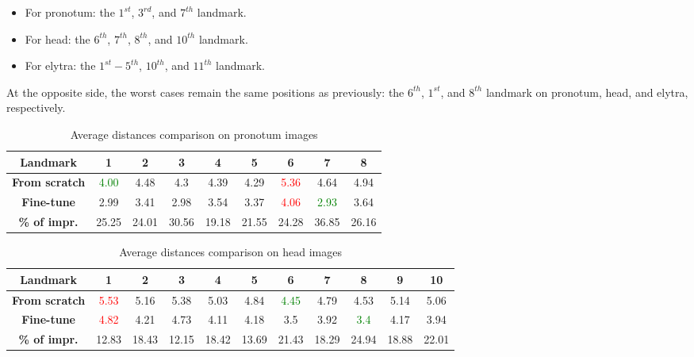 \documentclass[review]{elsarticle}
\begin{document}
\begin{itemize}
	\item For pronotum: the $1^{st}$, $3^{rd}$, and $7^{th}$ landmark.
	\item For head: the $6^{th}$, $7^{th}$, $8^{th}$, and $10^{th}$ landmark.
	\item For elytra: the $1^{st} - 5 ^{th}$, $10^{th}$, and $11^{th}$ landmark.
\end{itemize}

At the opposite side, the worst cases remain the same positions as previously: the $6^{th}$, $1^{st}$, and $8^{th}$ landmark on pronotum, head, and elytra, respectively.

\begin{table}[h!]
	\centering
	\begin{tabular}{| c || c | c | c | c | c | c | c | c |}
		\hline
		\textbf{Landmark} & 1 & 2 & 3 & 4 & 5 & 6 & 7 & 8 \\ \hline \hline
		\textbf{From scratch} & \textcolor{green}{4.00} & 4.48 & 4.3 & 4.39 & 4.29 & \textcolor{red}{5.36} & 4.64 & 4.94 \\ \hline
		\textbf{Fine-tune} & 2.99 & 3.41 & 2.98 & 3.54 & 3.37 & \textcolor{red}{4.06} & \textcolor{green}{2.93} & 3.64 \\ \hline \hline
		\textbf{\% of impr.} & 25.25 & 24.01 & 30.56 & 19.18 & 21.55 & 24.28 & 36.85 & 26.16 \\ \hline
	\end{tabular}
	\caption{Average distances comparison on pronotum images}
	\label{tblfn_pronotum}
\end{table}

\begin{table}[h!]
	\centering
	\begin{tabular}{| c || c | c | c | c | c | c | c | c | c | c |}
		\hline
		\textbf{Landmark} & 1 & 2 & 3 & 4 & 5 & 6 & 7 & 8 & 9 & 10 \\ \hline \hline
		\textbf{From scratch} & \textcolor{red}{5.53} & 5.16 & 5.38 & 5.03 & 4.84 & \textcolor{green}{4.45} & 4.79 & 4.53 & 5.14 & 5.06 \\ \hline
		\textbf{Fine-tune} & \textcolor{red}{4.82} & 4.21 & 4.73 & 4.11 & 4.18 & 3.5 & 3.92 & \textcolor{green}{3.4} & 4.17 & 3.94 \\ \hline \hline
		\textbf{\% of impr.} & 12.83 & 18.43 & 12.15 & 18.42 & 13.69 & 21.43 & 18.29 & 24.94 & 18.88 & 22.01 \\ \hline
	\end{tabular}
	\caption{Average distances comparison on head images}
	\label{tblfn_head}
\end{table}
\end{document}
